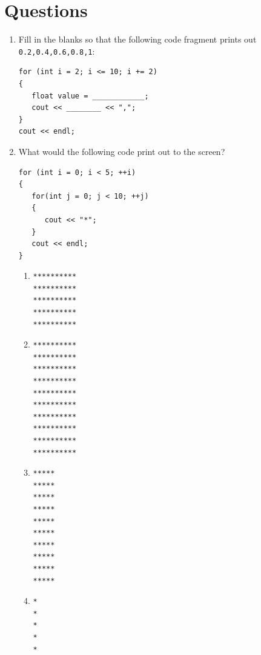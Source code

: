 \documentclass[letterpaper,12pt]{article}
\begin{document}
\section*{Questions}
\begin{enumerate}
	\item Fill in the blanks so that the following code fragment prints out \lstinline$0.2,0.4,0.6,0.8,1$:

\begin{lstlisting}[frame=none]
for (int i = 2; i <= 10; i += 2)
{
   float value = ____________;
   cout << ________ << ",";
}
cout << endl;
\end{lstlisting}

	\item What would the following code print out to the screen?

\begin{lstlisting}[frame=none]
for (int i = 0; i < 5; ++i)
{
   for(int j = 0; j < 10; ++j)
   {
      cout << "*";
   }
   cout << endl;
}
\end{lstlisting}

		\begin{multicols}{2}
		\begin{enumerate}
			\item

\begin{lstlisting}[frame=none]
**********
**********
**********
**********
**********
\end{lstlisting}

			\item 

\begin{lstlisting}[frame=none]
**********
**********
**********
**********
**********
**********
**********
**********
**********
**********
\end{lstlisting}

			\item 

\begin{lstlisting}[frame=none]
*****
*****
*****
*****
*****
*****
*****
*****
*****
*****
\end{lstlisting}

			\item 

\begin{lstlisting}[frame=none]
*
*
*
*
*
\end{lstlisting}


		\end{enumerate}
		\end{multicols}


\end{enumerate}
\end{document}

